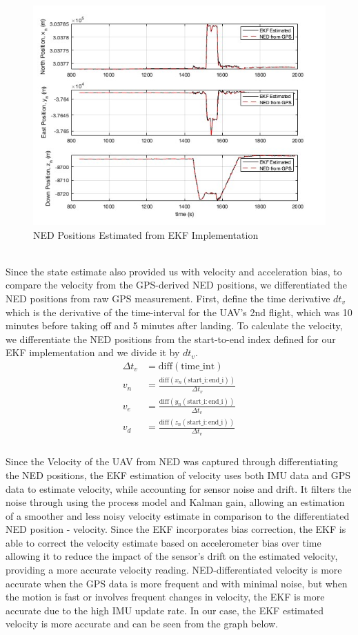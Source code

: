 \begin{figure}[H]
  \centering
 \includegraphics[width=0.8\linewidth, height=0.7\linewidth]{EKF/EKF_Pos.jpg}  
\caption{NED Positions Estimated from EKF Implementation}
\label{fig:EKFPos}
\end{figure}
\\
Since the state estimate also provided us with velocity and acceleration bias, to compare the velocity from the GPS-derived NED positions, we differentiated the NED positions from raw GPS measurement. First, define the time derivative $dt_v$ which is the derivative of the time-interval for the UAV's 2nd flight, which was 10 minutes before taking off and 5 minutes after landing. To calculate the velocity, we differentiate the NED positions from the start-to-end index defined for our EKF implementation and we divide it by $dt_v$.
\begin{align*}
    \Delta t_v &= \text{diff}( \text{time\_int} ) \\
    v_n &= \frac{\text{diff}(x_n( \text{start\_i} : \text{end\_i}))}{\Delta t_v} \\
    v_e &= \frac{\text{diff}(y_n( \text{start\_i} : \text{end\_i}))}{\Delta t_v} \\
    v_d &= \frac{\text{diff}(z_n( \text{start\_i} : \text{end\_i}))}{\Delta t_v} \\
\end{align*}\\
Since the Velocity of the UAV from NED was captured through differentiating the NED positions, the EKF estimation of velocity uses both IMU data and GPS data to estimate velocity, while accounting for sensor noise and drift. It filters the noise through using the process model and Kalman gain, allowing an estimation of a smoother and less noisy velocity estimate in comparison to the differentiated NED position - velocity. Since the EKF incorporates bias correction, the EKF is able to correct the velocity estimate based on accelerometer bias over time allowing it to reduce the impact of the sensor's drift on the estimated velocity, providing a more accurate velocity reading. NED-differentiated velocity is more accurate when the GPS data is more frequent and with minimal noise, but when the motion is fast or involves frequent changes in velocity, the EKF is more accurate due to the high IMU update rate. In our case, the EKF estimated velocity is more accurate and can be seen from the graph below.

